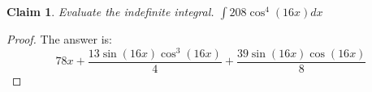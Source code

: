 \documentclass{article}
\newtheorem{theorem}{Claim}
\begin{document}
\begin{theorem}
Evaluate the indefinite integral.
$\int 208 \cos^4(16x) dx$
\end{theorem}

\begin{proof}
The answer is:
\[
78 x + \frac{13 \sin{\left(16 x \right)} \cos^{3}{\left(16 x \right)}}{4} + \frac{39 \sin{\left(16 x \right)} \cos{\left(16 x \right)}}{8}
\]
\end{proof}
\end{document}
